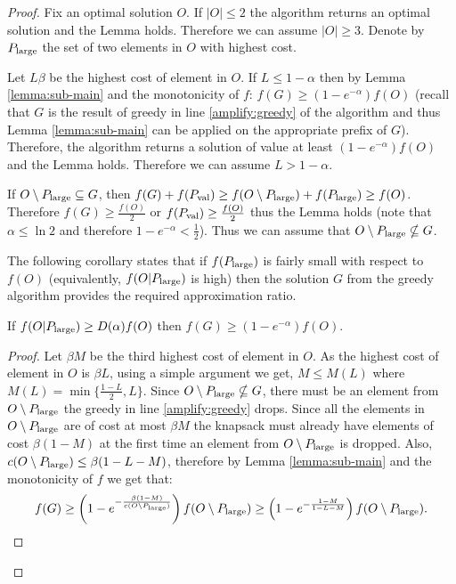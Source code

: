 \documentclass[a4paper]{article}
\begin{document}
\begin{proof}

	Fix an optimal solution $O$.
	 If $|O|\leq 2$ the algorithm returns an optimal solution and the Lemma holds.
	Therefore we can assume $|O| \geq 3$.  Denote by $P_{\text{large}}$ the set of  two  elements in $O$ with highest cost.
	
	Let $L\beta$ be the highest cost of element in $O$.  If $L\leq 1-\alpha$ then
	by Lemma \ref{lemma:sub-main} and the monotonicity of $f$: $f(G) \geq (1-e^{-\alpha}) f(O)$  (recall that $G$ is the result of
	greedy in line \ref{amplify:greedy} of the algorithm and thus Lemma \ref{lemma:sub-main} can be applied on the appropriate prefix of $G$). Therefore, the algorithm
	returns a solution of value at least $(1-e^{-\alpha})f(O)$ and the Lemma holds. Therefore we can assume  $L> 1-\alpha$.
%
	
	If $O\setminus P_{\text{large}} \subseteq G$, then
	$f(G)+ f(P_{\text{val}})\geq f(O\setminus P_{\text{large}}) + f(P_{\text{large}}) \geq f(O)$.
	Therefore $f(G)\geq \frac{f(O)}{2}$ or $f(P_{\text{val}})\geq \frac{f(O)}{2}$
	thus the Lemma holds (note that $\alpha \leq \ln 2$ and therefore
	$1-e^{-\alpha} < \frac{1}{2}$). Thus we can assume that
	$O\setminus P_{\text{large}} \nsubseteq G$.
	
	The following corollary states that if $f(P_{\text{large}})$ is fairly small
	with respect to $f(O)$ (equivalently, $f(O|P_{\text{large}})$ is high) then the solution $G$ from the greedy algorithm provides
	the required approximation ratio.
	
	\begin{corollary}
		\label{corollary:cor1}
	If $f(O|P_{\text{large}}) \geq D(\alpha) f(O)$ then $f(G)\geq (1-e^{-\alpha})f(O)$.
	\end{corollary}

\begin{proof}
	

	Let $\beta M$ be the third highest cost of element in  $O$.
	As the highest cost of  element in $O$ is $\beta L$,
	using a simple argument we get, $M\leq M(L)$ where $M(L)= \min \{\frac{1-L}{2}, L\}$. Since
	$O\setminus P_{\text{large}} \nsubseteq G$, there must be an element from $O \setminus P_{\text{large}}$ the greedy in line \ref{amplify:greedy} drops. Since all the elements
	in $O\setminus P_{\text{large}}$ are of cost at most $\beta M$ the knapsack must
	already have elements of cost $\beta (1-M)$ at the first time an element from $O\setminus P_{\text{large}}$ is dropped. Also, $c(O\setminus P_{\text{large}}) \leq \beta(1-L -M)$, therefore by Lemma \ref{lemma:sub-main} and the monotonicity of $f$ we get that:
  	$$f(G)\geq \left(1-e^{- \frac{\beta (1-M) }{c(O\setminus P_{\text{large}})}}\right) f(O\setminus P_{\text{large}})
  			\geq \left(1-e^{- \frac{1-M }{1-L-M}}\right) f(O\setminus P_{\text{large}}) .$$
  			

\end{proof}
\end{proof}
\end{document}
